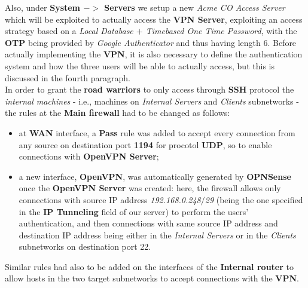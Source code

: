 Also, under \textbf{System $->$ Servers} we setup a new \textit{Acme CO Access Server} which will be exploited to actually access the \textbf{VPN Server}, exploiting an access strategy based on a \textit{Local Database $+$ Timebased One Time Password}, with the  \textbf{OTP} being provided by \textit{Google Authenticator} and thus having length 6. Before actually implementing the \textbf{VPN}, it is also necessary to define the authentication system and how the three users will be able to actually access, but this is discussed in the fourth paragraph.\\
In order to grant the \textbf{road warriors} to only access through \textbf{SSH} protocol the \textit{internal machines} - i.e., machines on \textit{Internal Servers} and \textit{Clients} subnetworks - the rules at the \textbf{Main firewall} had to be changed as follows:\\
\begin{itemize}
\item at \textbf{WAN} interface, a \textbf{Pass} rule was added to accept every connection from any source on destination port \textbf{1194} for procotol \textbf{UDP}, so to enable connections with \textbf{OpenVPN Server};
\item a new interface, \textbf{OpenVPN}, was automatically generated by \textbf{OPNSense} once the \textbf{OpenVPN Server} was created: here, the firewall allows only connections with source IP address \textit{192.168.0.248$/$29} (being the one specified in the \textbf{IP Tunneling} field of our server) to perform the users' authentication, and then connections with same source IP address and destination IP address being either in the \textit{Internal Servers} or in the \textit{Clients} subnetworks on destination port 22.
\end{itemize}

Similar rules had also to be added on the interfaces of the \textbf{Internal router} to allow hosts in the two target subnetworks to accept connections with the \textbf{VPN}.
